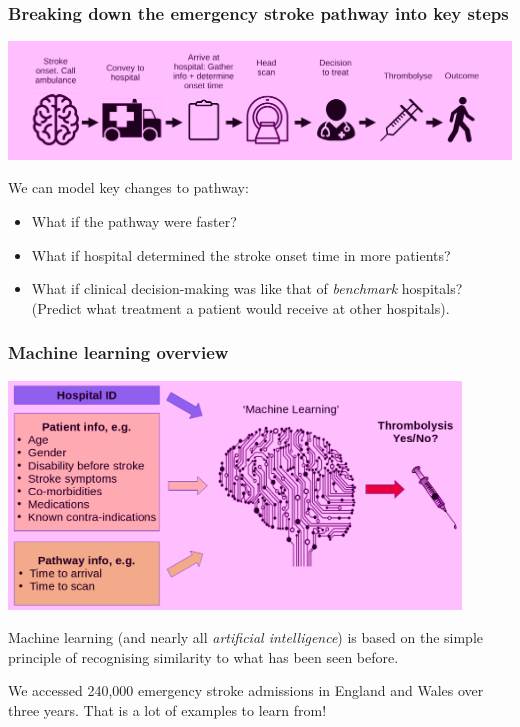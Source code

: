 \documentclass{beamer}
\begin{document}

\begin{frame}
\frametitle{Breaking down the emergency stroke pathway into key steps}
\begin{center}
\includegraphics[width=1.05\textwidth]{./images/pathway}
\end{center}
We can model key changes to pathway:
\begin{itemize}
    \item What if the pathway were faster?
    \item What if hospital determined the stroke onset time in more patients?
    \item What if clinical decision-making was like that of \emph{benchmark} hospitals? (Predict what treatment a patient would receive at other hospitals).
\end{itemize}
\end{frame}


\begin{frame}
\frametitle{Machine learning overview}
\begin{center}
\includegraphics[width=0.90\textwidth]{./images/ml_model_high_level}
\end{center}

Machine learning (and nearly all \emph{artificial intelligence}) is based on the simple principle of recognising similarity to what has been seen before.
\vspace{3mm}

We accessed 240,000 emergency stroke admissions in England and Wales over three years. That is a lot of examples to learn from!
\end{frame}
\end{document}

